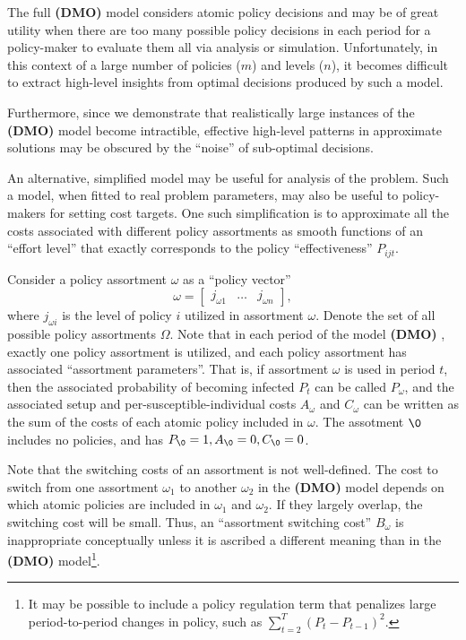 \documentclass{article}
\newcommand{\model}{{\bf (DMO) }}
\begin{document}
The full \model model considers atomic policy decisions and may be of great utility when there are too many possible policy decisions in each period for a policy-maker to evaluate them all via analysis or simulation. Unfortunately, in this context of a large number of policies ($m$) and levels ($n$), it becomes difficult to extract high-level insights from optimal decisions produced by such a model.

Furthermore, since we demonstrate that realistically large instances of the \model model become intractible, effective high-level patterns in approximate solutions may be obscured by the ``noise'' of sub-optimal decisions.

An alternative, simplified model may be useful for analysis of the problem. Such a model, when fitted to real problem parameters, may also be useful to policy-makers for setting cost targets. One such simplification is to approximate all the costs associated with different policy assortments as smooth functions of an ``effort level'' that exactly corresponds to the policy ``effectiveness'' $P_{ijt}$.



Consider a policy assortment $\omega$ as a ``policy vector''
\[
    \omega = \begin{bmatrix} j_{\omega 1} & \ldots & j_{\omega n}   \end{bmatrix},
\]
where $j_{\omega i}$ is the level of policy $i$ utilized in assortment $\omega$. Denote the set of all possible policy assortments $\Omega$.  Note that in each period of the model \model, exactly one policy assortment is utilized, and each policy assortment has associated ``assortment parameters''. That is, if assortment $\omega$ is used in period $t$, then the associated probability of becoming infected $P_t$ can be called $P_\omega$, and the associated setup and per-susceptible-individual costs $A_\omega$ and $C_\omega$ can be written as the sum of the costs of each atomic policy included in $\omega$. The assotment $\0$ includes no policies, and has $P_{\0}=1, A_{\0}=0, C_{\0}=0$.

Note that the switching costs of an assortment is not well-defined. The cost to switch from one assortment $\omega_1$ to another $\omega_2$ in the \model model depends on which atomic policies are included in $\omega_1$ and $\omega_2$. If they largely overlap, the switching cost will be small. Thus, an ``assortment switching cost'' $B_\omega$ is inappropriate conceptually unless it is ascribed a different meaning than in the \model model\footnote{It may be possible to include a policy regulation term that penalizes large period-to-period changes in policy, such as $\sum_{t=2}^{T}(P_t-P_{t-1})^2$.}.
\end{document}
